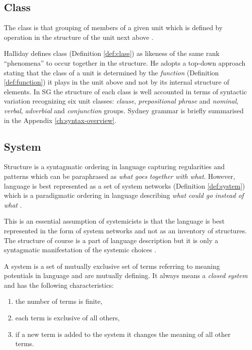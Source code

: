 \subsection{Class}
\begin{definition}[Class]\label{def:class}
	The class is that grouping of members of a given unit which is defined by operation in the structure of the unit next above \citep[p.49]{Halliday2002}.
\end{definition}

Halliday defines class (Definition \ref{def:class}) as likeness of the same rank ``phenomena'' to occur together in the structure. He adopts a top-down approach stating that the class of a unit is determined by the \textit{function} (Definition \ref{def:function}) it plays in the unit above and not by its internal structure of elements. In SG the structure of each class is well accounted in terms of syntactic variation recognizing six unit classes: \textit{clause}, \textit{prepositional phrase} and \textit{nominal}, \textit{verbal}, \textit{adverbial} and \textit{conjunction} groups.
Sydney grammar is briefly summarised in the Appendix \ref{ch:syntax-overview}. %

\subsection{System}
\label{sec:system}
Structure is a syntagmatic ordering in language capturing regularities and patterns which can be paraphrased as \textit{what goes together with what}. However, language is best represented as a set of system networks (Definition \ref{def:system}) which is a paradigmatic ordering in language describing \textit{what could go instead of what} \citep[p.~22]{Halliday2013}.

This is an essential assumption of systemicists is that the language is best represented in the form of system networks and not as an inventory of structures. The structure of course is a part of language description but it is only a syntagmatic manifestation of the systemic choices \citep[p.23]{Halliday2013}.

\begin{definition}[System]\label{def:system}
	A system is a set of mutually exclusive set of terms referring to meaning potentials in language and are mutually defining. It always means a \textit{closed system} and has the following characteristics:
	\begin{enumerate}
		\item the number of terms is finite,
		\item each term is exclusive of all others,
		\item if a new term is added to the system it changes the meaning of all other terms. \citep[p.41]{Halliday2002}
	\end{enumerate}
\end{definition}


